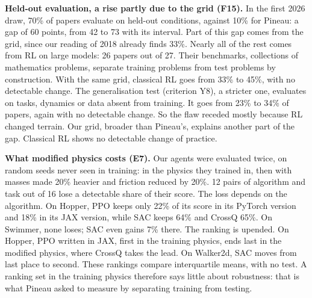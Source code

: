 \documentclass[11pt,a4paper]{article}
\begin{document}
\textbf{Held-out evaluation, a rise partly due to the grid (F15).} In
the first 2026 draw, 70\% of papers evaluate on held-out conditions,
against 10\% for Pineau: a gap of 60 points, from 42 to 73 with its
interval. Part of this gap comes from the grid, since our reading of
2018 already finds 33\%. Nearly all of the rest comes from RL on large
models: 26 papers out of 27. Their benchmarks, collections of
mathematics problems, separate training problems from test problems by
construction. With the same grid, classical RL goes from 33\% to 45\%,
with no detectable change. The generalisation test (criterion Y8), a
stricter one, evaluates on tasks, dynamics or data absent from training.
It goes from 23\% to 34\% of papers, again with no detectable change. So
the flaw receded mostly because RL changed terrain. Our grid, broader
than Pineau's, explains another part of the gap. Classical RL shows no
detectable change of practice.

\textbf{What modified physics costs (E7).} Our agents were evaluated
twice, on random seeds never seen in training: in the physics they
trained in, then with masses made 20\% heavier and friction reduced by
20\%. 12 pairs of algorithm and task out of 16 lose a detectable share
of their score. The loss depends on the algorithm. On Hopper, PPO keeps
only 22\% of its score in its PyTorch version and 18\% in its JAX
version, while SAC keeps 64\% and CrossQ 65\%. On Swimmer, none loses;
SAC even gains 7\% there. The ranking is upended. On Hopper, PPO written
in JAX, first in the training physics, ends last in the modified
physics, where CrossQ takes the lead. On Walker2d, SAC moves from last
place to second. These rankings compare interquartile means, with no
test. A ranking set in the training physics therefore says little about
robustness: that is what Pineau asked to measure by separating training
from testing.
\end{document}
